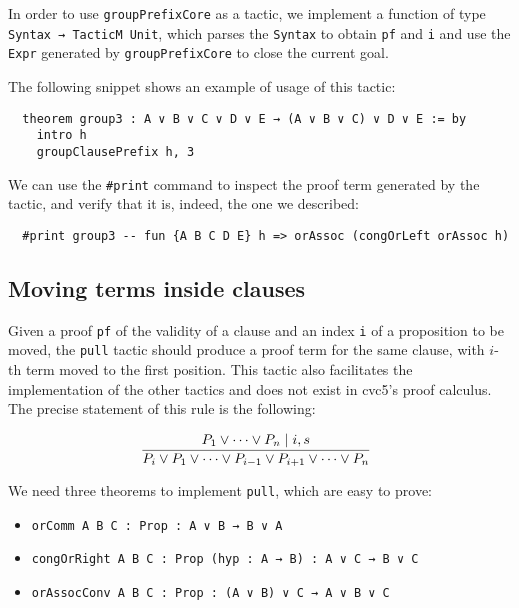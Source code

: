 In order to use \texttt{groupPrefixCore} as a tactic, we implement
a function of type \texttt{Syntax → TacticM Unit}, which parses the \texttt{Syntax}
to obtain \texttt{pf} and \texttt{i} and use the \texttt{Expr} generated by
\texttt{groupPrefixCore} to close the current goal.

The following snippet shows an example of usage of this tactic:

\newpage

\begin{verbatim}
  theorem group3 : A ∨ B ∨ C ∨ D ∨ E → (A ∨ B ∨ C) ∨ D ∨ E := by
    intro h
    groupClausePrefix h, 3
\end{verbatim}

We can use the \texttt{\#print} command to inspect the proof term generated by the tactic, and
verify that it is, indeed, the one we described:

\begin{verbatim}
  #print group3 -- fun {A B C D E} h => orAssoc (congOrLeft orAssoc h)
\end{verbatim}

\subsection*{Moving terms inside clauses}

Given a proof \texttt{pf} of the validity of a clause and an index \texttt{i} of a proposition to be moved, the \texttt{pull} tactic should produce a proof term for the same clause,
with $i$-th term moved to the first position. This tactic also facilitates the implementation
of the other tactics and does not exist in cvc5's proof calculus. The precise
statement of this rule is the following:

\[
  \infer[]{P_{i} \vee P_{1} \vee \cdots \vee P_{i - 1} \vee P_{i + 1} \vee \cdots \vee P_{n}}{P_{1} \vee \cdots \vee P_{n}  \mid i, s}
\]


We need three theorems to implement \texttt{pull}, which are easy to prove:

\begin{itemize}
  \item \texttt{orComm {A B C : Prop} : A ∨ B → B ∨ A}
  \item \texttt{congOrRight {A B C : Prop} (hyp : A → B) : A ∨ C → B ∨ C}
  \item \texttt{orAssocConv {A B C : Prop} : (A ∨ B) ∨ C → A ∨ B ∨ C}
\end{itemize}

